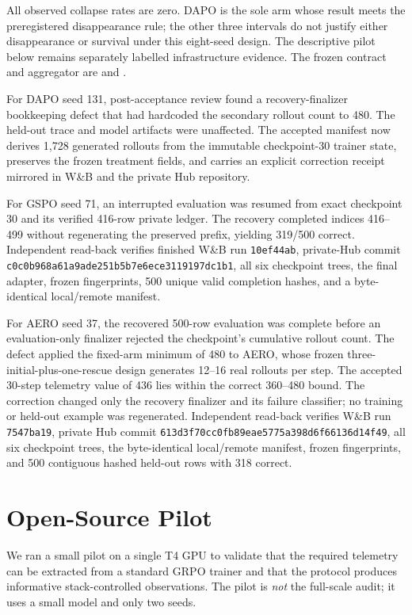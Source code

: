 \documentclass[11pt]{article}
\begin{document}
All observed collapse rates are zero. DAPO is the sole arm whose result meets
the preregistered disappearance rule; the other three intervals do not justify
either disappearance or survival under this eight-seed design. The descriptive
pilot below remains separately labelled infrastructure evidence. The frozen
contract and aggregator are
 and
.

For DAPO seed 131, post-acceptance review found a recovery-finalizer
bookkeeping defect that had hardcoded the secondary rollout count to 480. The
held-out trace and model artifacts were unaffected. The accepted manifest now
derives 1,728 generated rollouts from the immutable checkpoint-30 trainer state,
preserves the frozen treatment fields, and carries an explicit correction
receipt mirrored in W\&B and the private Hub repository.

For GSPO seed 71, an interrupted evaluation was resumed from exact checkpoint
30 and its verified 416-row private ledger. The recovery completed indices
416--499 without regenerating the preserved prefix, yielding 319/500 correct.
Independent read-back verifies finished W\&B run \texttt{10ef44ab}, private-Hub
commit \texttt{c0c0b968a61a9ade251b5b7e6ece3119197dc1b1}, all six checkpoint
trees, the final adapter, frozen fingerprints, 500 unique valid completion
hashes, and a byte-identical local/remote manifest.

For AERO seed 37, the recovered 500-row evaluation was complete before an
evaluation-only finalizer rejected the checkpoint's cumulative rollout count.
The defect applied the fixed-arm minimum of 480 to AERO, whose frozen
three-initial-plus-one-rescue design generates 12--16 real rollouts per step.
The accepted 30-step telemetry value of 436 lies within the correct 360--480
bound. The correction changed only the recovery finalizer and its failure
classifier; no training or held-out example was regenerated. Independent
read-back verifies W\&B run \texttt{7547ba19}, private Hub commit
\texttt{613d3f70cc0fb89eae5775a398d6f66136d14f49}, all six checkpoint trees,
the byte-identical local/remote manifest, frozen fingerprints, and 500
contiguous hashed held-out rows with 318 correct.

\section{Open-Source Pilot}
\label{sec:pilot}


We ran a small pilot on a single T4 GPU to validate that the required telemetry
can be extracted from a standard GRPO trainer and that the protocol produces
informative stack-controlled observations. The pilot is \emph{not} the
full-scale audit; it uses a small model and only two seeds.
\end{document}
